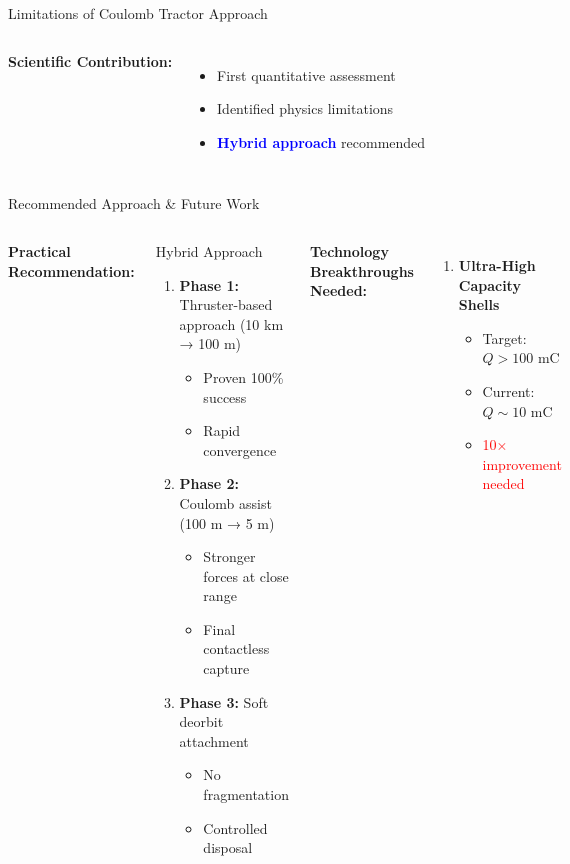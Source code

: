 \documentclass[aspectratio=169]{beamer}
\begin{document}
\begin{frame}{Limitations of Coulomb Tractor Approach}
\begin{columns}
\vspace{0.5em}
\textbf{Scientific Contribution:}
\begin{itemize}
    \item First quantitative assessment
    \item Identified physics limitations
    \item \textcolor{blue}{\textbf{Hybrid approach}} recommended
\end{itemize}
\end{columns}
\end{frame}

\begin{frame}{Recommended Approach \& Future Work}
\begin{columns}
\textbf{Practical Recommendation:}

\begin{block}{Hybrid Approach}
\begin{enumerate}
    \item \textbf{Phase 1:} Thruster-based approach (10 km → 100 m)
    \begin{itemize}
        \item Proven 100\% success
        \item Rapid convergence
    \end{itemize}

    \item \textbf{Phase 2:} Coulomb assist (100 m → 5 m)
    \begin{itemize}
        \item Stronger forces at close range
        \item Final contactless capture
    \end{itemize}

    \item \textbf{Phase 3:} Soft deorbit attachment
    \begin{itemize}
        \item No fragmentation
        \item Controlled disposal
    \end{itemize}
\end{enumerate}
\end{block}

\textbf{Technology Breakthroughs Needed:}
\begin{enumerate}
    \item \textbf{Ultra-High Capacity Shells}
    \begin{itemize}
        \item Target: $Q > 100$ mC
        \item Current: $Q \sim 10$ mC
        \item \textcolor{red}{10× improvement needed}
    \end{itemize}


\end{enumerate}
\end{columns}
\end{frame}
\end{document}
